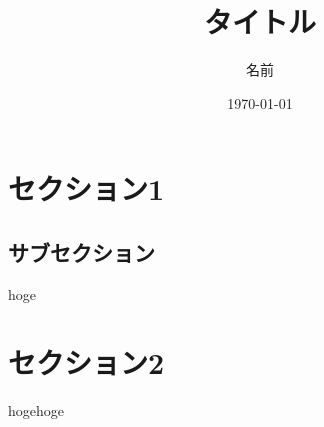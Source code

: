\documentclass[11pt, a4paper, titlepage]{jarticle}
\title{タイトル}
\author{名前}
\date{\today}
\begin{document}
\maketitle
\tableofcontents
\clearpage

\section{セクション1}

\begin{comment}

\begin{figure}[htbp]
    \begin{minipage}{0.5\hsize}
     \begin{center}
      \texttt{[image: graph01.jpeg]}
     \end{center}
     \caption{caption1}
     \label{fig:one}
    \end{minipage}
    \begin{minipage}{0.5\hsize}
     \begin{center}
      \texttt{[image: graph02.jpeg]}
     \end{center}
     \caption{caption2}
     \label{fig:two}
    \end{minipage}
\end{figure}

\end{comment}

\subsection{サブセクション}
hoge

\section{セクション2}
hogehoge
\end{document}
